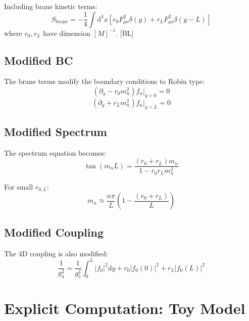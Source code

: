 \documentclass[11pt,a4paper]{article}
\newcommand{\dd}{\mathrm{d}}
\begin{document}
Including brane kinetic terms:
\begin{equation}
S_{\text{brane}} = -\frac{1}{4} \int \dd^4x \left[
r_0 F_{\mu\nu}^2 \delta(y) + r_L F_{\mu\nu}^2 \delta(y-L)
\right]
\label{eq:brane-action}
\end{equation}
where $r_0, r_L$ have dimension $[M]^{-1}$. [BL]

\subsection{Modified BC}

The brane terms modify the boundary conditions to Robin type:
\begin{equation}
(\partial_y - r_0 m_n^2) f_n\big|_{y=0} = 0
\label{eq:robin-from-brane-0}
\end{equation}
\begin{equation}
(\partial_y + r_L m_n^2) f_n\big|_{y=L} = 0
\label{eq:robin-from-brane-L}
\end{equation}

\subsection{Modified Spectrum}

The spectrum equation becomes:
\begin{equation}
\tan(m_n L) = \frac{(r_0 + r_L) m_n}{1 - r_0 r_L m_n^2}
\label{eq:brane-spectrum}
\end{equation}

For small $r_{0,L}$:
\begin{equation}
m_n \approx \frac{n\pi}{L}\left(1 - \frac{(r_0 + r_L)}{L}\right)
\label{eq:brane-spectrum-approx}
\end{equation}

\subsection{Modified Coupling}

The 4D coupling is also modified:
\begin{equation}
\frac{1}{g_4^2} = \frac{1}{g_5^2} \int_0^L |f_0|^2 \dd y + r_0 |f_0(0)|^2 + r_L |f_0(L)|^2
\label{eq:brane-coupling}
\end{equation}

\section{Explicit Computation: Toy Model}
\label{app:toy}
\end{document}
